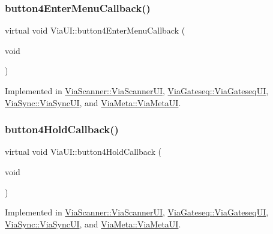 \mbox{\label{class_via_u_i_a6db24e53e559b6fddd4cb1f918de40d6}} 
\subsubsection{\texorpdfstring{button4\+Enter\+Menu\+Callback()}{button4EnterMenuCallback()}}
{\footnotesize\ttfamily virtual void Via\+U\+I\+::button4\+Enter\+Menu\+Callback (\begin{DoxyParamCaption}\item[{void}]{ }\end{DoxyParamCaption})\hspace{0.3cm}{\ttfamily [pure virtual]}}



Implemented in \mbox{\hyperlink{class_via_scanner_1_1_via_scanner_u_i_a45b4492b06d3b834c4934ace2d7d15aa}{Via\+Scanner\+::\+Via\+Scanner\+UI}}, \mbox{\hyperlink{class_via_gateseq_1_1_via_gateseq_u_i_a2f739b43b005baf5bc8dd4d081c5b6d5}{Via\+Gateseq\+::\+Via\+Gateseq\+UI}}, \mbox{\hyperlink{class_via_sync_1_1_via_sync_u_i_a01e30440d48527321570f93d67e93aa5}{Via\+Sync\+::\+Via\+Sync\+UI}}, and \mbox{\hyperlink{class_via_meta_1_1_via_meta_u_i_aef07210c32f8147e6b5ab92b923347e9}{Via\+Meta\+::\+Via\+Meta\+UI}}.

\mbox{\label{class_via_u_i_a11919091b39319fe4d1b3a3f3c7104c5}} 
\subsubsection{\texorpdfstring{button4\+Hold\+Callback()}{button4HoldCallback()}}
{\footnotesize\ttfamily virtual void Via\+U\+I\+::button4\+Hold\+Callback (\begin{DoxyParamCaption}\item[{void}]{ }\end{DoxyParamCaption})\hspace{0.3cm}{\ttfamily [pure virtual]}}



Implemented in \mbox{\hyperlink{class_via_scanner_1_1_via_scanner_u_i_a5d8656812822494d9c202f40ef0882ab}{Via\+Scanner\+::\+Via\+Scanner\+UI}}, \mbox{\hyperlink{class_via_gateseq_1_1_via_gateseq_u_i_a8d4d728d1f66bf2f72ae4e9669895719}{Via\+Gateseq\+::\+Via\+Gateseq\+UI}}, \mbox{\hyperlink{class_via_sync_1_1_via_sync_u_i_a7b84320153b6b7e4ae5499f4092a85d5}{Via\+Sync\+::\+Via\+Sync\+UI}}, and \mbox{\hyperlink{class_via_meta_1_1_via_meta_u_i_aa43b104c1a726fad1c530cb50eb305f6}{Via\+Meta\+::\+Via\+Meta\+UI}}.

